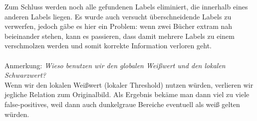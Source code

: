 \documentclass[paper=A4, deutsch]{scrartcl}
\begin{document}
Zum Schluss werden noch alle gefundenen Labels eliminiert, die innerhalb eines anderen Labels liegen. Es wurde auch versucht überschneidende Labels zu verwerfen, jedoch gäbe es hier ein Problem: wenn zwei Bücher extram nah beieinander stehen, kann es passieren, dass damit mehrere Labels zu einem verschmolzen werden und somit korrekte Information verloren geht.\\
\\
Anmerkung: \textit{Wieso benutzen wir den globalen Weißwert und den lokalen Schwarzwert?}\\
Wenn wir den lokalen Weißwert (lokaler Threshold) nutzen würden, verlieren wir jegliche Relation zum Originalbild. Als Ergebnis bekäme man dann viel zu viele false-positives, weil dann auch dunkelgraue Bereiche eventuell als weiß gelten würden.\\
\\
\\
\end{document}
